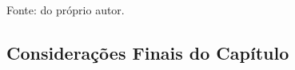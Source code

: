 \begin{table}[H]
    \vspace*{1cm}
    Fonte: do próprio autor.
\end{table}

\subsection{Considerações Finais do Capítulo}